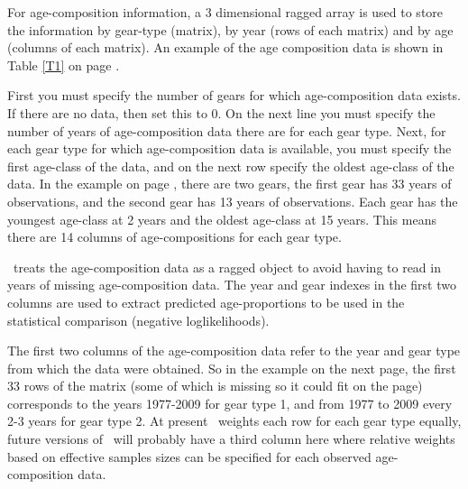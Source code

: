 \begin{multicols}{2}
For age-composition information, a 3 dimensional ragged array is used to store the information by gear-type (matrix), by year (rows of each matrix) and by age (columns of each matrix).  An example of the age composition data is shown in Table \ref{T1} on page \pageref{T1}.  

First you must specify the number of gears for which age-composition data exists.  If there are no data, then set this to 0. On  the next line you must specify the number of years of age-composition data there are for each gear type.  Next, for each gear type for which age-composition data is available, you must specify the first age-class of the data, and on the next row specify the oldest age-class of the data.  In the example on page \pageref{T1}, there are two gears, the first gear has 33 years of observations, and the second gear has 13 years of observations.  Each gear has the youngest age-class at 2 years and the oldest age-class at 15 years.  This means there are 14 columns of age-compositions for each gear type. 

\iscam\ treats the age-composition data as a ragged object to avoid having to read in years of missing age-composition data.  The year and gear indexes in the first two columns are used to extract predicted age-proportions to be used in the statistical comparison (negative loglikelihoods).

The first two columns of the age-composition data refer to the year and gear type from which the data were obtained.  So in the example on the next page, the first 33 rows of the matrix (some of which is missing so it could fit on the page) corresponds to the years 1977-2009 for gear type 1, and from 1977 to 2009 every 2-3 years for gear type 2.  At present \iscam\ weights each row for each gear type equally, future versions of \iscam\ will probably have a third column here where relative weights based on effective samples sizes can be specified for each observed age-composition data.


\end{multicols}

